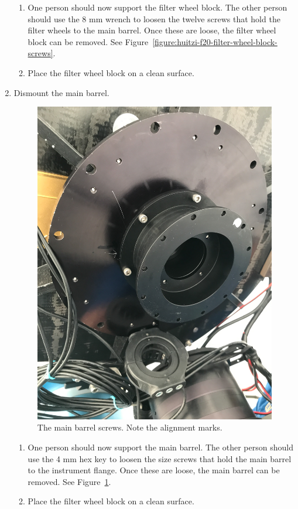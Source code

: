 \begin{enumerate}
\begin{enumerate}
  \item One person should now support the filter wheel block. The other person should use the 8 mm wrench to loosen the twelve screws that hold the filter wheels to the main barrel. Once these are loose, the filter wheel block can be removed. See Figure~\ref{figure:huitzi-f20-filter-wheel-block-screws}.
  
  \item Place the filter wheel block on a clean surface.
  
\end{enumerate}

\item Dismount the main barrel.

\begin{figure}
\begin{center}
\includegraphics[angle=0,width=0.8\linewidth]{figures/huitzi-f20-main-barrel-screws}
\end{center}
\caption{The main barrel screws. Note the alignment marks.}
\label{figure:huitzi-f20-main-barrel-screws}
\end{figure}
   

\begin{enumerate}
    
  \item One person should now support the main barrel. The other person should use the 4 mm hex key to loosen the size screws that hold the main barrel to the instrument flange. Once these are loose, the main barrel can be removed. See Figure~\ref{figure:huitzi-f20-main-barrel-screws}.
  
  \item Place the filter wheel block on a clean surface.


\end{enumerate}

\end{enumerate}


